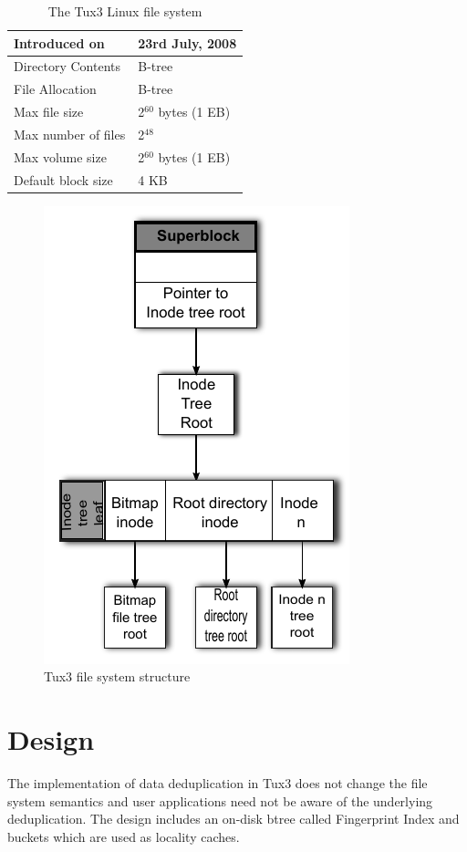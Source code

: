 \documentclass[final]{ols}
\begin{document}
\begin{table}[!th]
\centering
\begin{tabular}{l | l}
Introduced on & 23rd July, 2008 \tabularnewline
\hline
Directory Contents & B-tree \tabularnewline
\hline
File Allocation & B-tree  \tabularnewline
\hline
Max file size & 2$^{60}$ bytes (1 EB) \tabularnewline
\hline
Max number of files & 2$^{48}$ \tabularnewline
\hline
Max volume size & 2$^{60}$  bytes (1 EB) \tabularnewline
\hline
Default block size & 4 KB \tabularnewline
\end{tabular}
\caption{The Tux3 Linux file system}
\label{tux3-info}
\end{table}

\begin{figure}[H]
\begin{center}
\includegraphics[width=0.7\columnwidth]{images/tux3_structure2}
\caption{Tux3 file system structure}  
\end{center}
\end{figure}

\section{Design}
The implementation of data deduplication in Tux3 does not change the file system semantics and user applications need not be aware of the underlying deduplication. The design includes an on-disk btree called Fingerprint Index and buckets which are used as locality caches.
\end{document}
